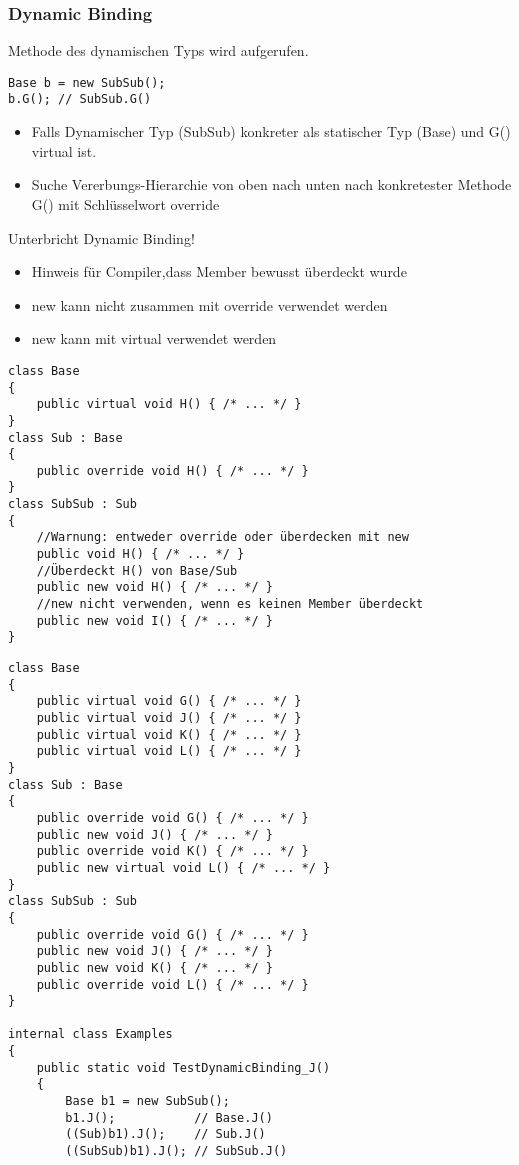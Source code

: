 \begin{multicols*}{2}
\subsubsection{Dynamic Binding}
Methode des dynamischen Typs wird aufgerufen.
\begin{lstlisting}
Base b = new SubSub();
b.G(); // SubSub.G()
\end{lstlisting}
\begin{itemize}
    \item Falls Dynamischer Typ (SubSub) konkreter als statischer Typ (Base) und G() virtual ist.
    \item Suche Vererbungs-Hierarchie von oben nach unten nach konkretester Methode G() mit Schlüsselwort override
\end{itemize}
Unterbricht Dynamic Binding!
\begin{itemize}
    \item Hinweis für Compiler,dass Member bewusst überdeckt wurde
    \item new kann nicht zusammen mit override verwendet werden
    \item new kann mit virtual verwendet werden
\end{itemize}
\begin{lstlisting}
class Base 
{
    public virtual void H() { /* ... */ }
}
class Sub : Base 
{
    public override void H() { /* ... */ }
}
class SubSub : Sub
{
    //Warnung: entweder override oder überdecken mit new
    public void H() { /* ... */ } 
    //Überdeckt H() von Base/Sub
    public new void H() { /* ... */ } 
    //new nicht verwenden, wenn es keinen Member überdeckt
    public new void I() { /* ... */ }
}
\end{lstlisting}
\begin{lstlisting}
class Base
{
    public virtual void G() { /* ... */ }
    public virtual void J() { /* ... */ }
    public virtual void K() { /* ... */ }
    public virtual void L() { /* ... */ }
}
class Sub : Base
{
    public override void G() { /* ... */ }
    public new void J() { /* ... */ }
    public override void K() { /* ... */ }
    public new virtual void L() { /* ... */ }
}
class SubSub : Sub
{
    public override void G() { /* ... */ }
    public new void J() { /* ... */ }
    public new void K() { /* ... */ }
    public override void L() { /* ... */ }
}

internal class Examples
{
    public static void TestDynamicBinding_J()
    {
        Base b1 = new SubSub();
        b1.J();           // Base.J()
        ((Sub)b1).J();    // Sub.J()
        ((SubSub)b1).J(); // SubSub.J()


\end{lstlisting}
\end{multicols*}
